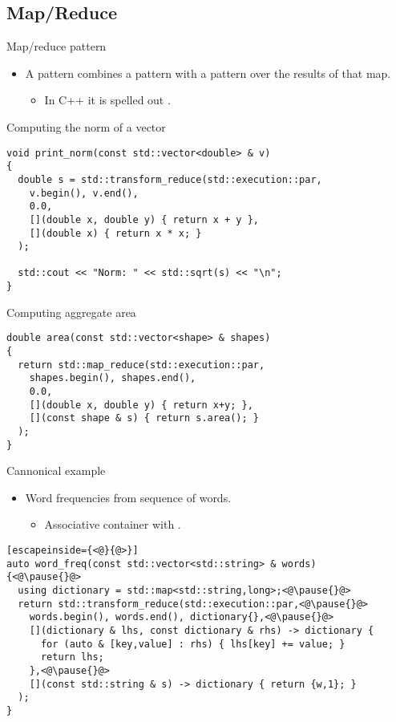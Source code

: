 \subsection{Map/Reduce}

\begin{frame}[t]{Map/reduce pattern}
\begin{itemize}
  \item A  pattern combines a 
         pattern with a  pattern
        over the results of that map.
    \begin{itemize}
      \item In C++ it is spelled out .
    \end{itemize}
\end{itemize}
\end{frame}

\begin{frame}[t,fragile]{Computing the norm of a vector}
\begin{lstlisting}
void print_norm(const std::vector<double> & v)
{
  double s = std::transform_reduce(std::execution::par,
    v.begin(), v.end(),
    0.0,
    [](double x, double y) { return x + y },
    [](double x) { return x * x; }
  );

  std::cout << "Norm: " << std::sqrt(s) << "\n";
}
\end{lstlisting}
\end{frame}

\begin{frame}[t,fragile]{Computing aggregate area}
\begin{lstlisting}
double area(const std::vector<shape> & shapes)
{
  return std::map_reduce(std::execution::par,
    shapes.begin(), shapes.end(),
    0.0,
    [](double x, double y) { return x+y; },
    [](const shape & s) { return s.area(); }
  );
}
\end{lstlisting}
\end{frame}

\begin{frame}[t,fragile]{Cannonical example}
\begin{itemize}
  \item Word frequencies from sequence of words.
    \begin{itemize}
      \item Associative container with .
    \end{itemize}
\end{itemize}
\begin{lstlisting}[escapeinside={<@}{@>}]
auto word_freq(const std::vector<std::string> & words) 
{<@\pause{}@>
  using dictionary = std::map<std::string,long>;<@\pause{}@>
  return std::transform_reduce(std::execution::par,<@\pause{}@>
    words.begin(), words.end(), dictionary{},<@\pause{}@>
    [](dictionary & lhs, const dictionary & rhs) -> dictionary {
      for (auto & [key,value] : rhs) { lhs[key] += value; }
      return lhs;
    },<@\pause{}@>
    [](const std::string & s) -> dictionary { return {w,1}; }
  );
}
\end{lstlisting}
\end{frame}
